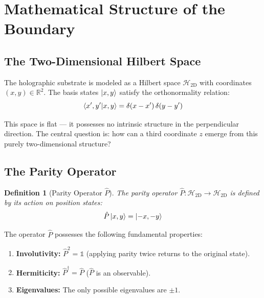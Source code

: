 \documentclass[12pt,a4paper,twoside]{article}
\newtheorem{definition}[theorem]{Definition}
\begin{document}

\section{Mathematical Structure of the Boundary}


\subsection{The Two-Dimensional Hilbert Space}

The holographic substrate is modeled as a Hilbert space $\mathcal{H}_{2\text{D}}$ with coordinates $(x, y) \in \mathbb{R}^2$. The basis states $\ket{x, y}$ satisfy the orthonormality relation:
\begin{equation}
\braket{x', y'}{x, y} = \delta(x - x')\,\delta(y - y')
\label{eq:ortonormalidade}
\end{equation}

This space is flat --- it possesses no intrinsic structure in the perpendicular direction. The central question is: how can a third coordinate $z$ emerge from this purely two-dimensional structure?

\subsection{The Parity Operator}

\begin{definition}[Parity Operator $\hat{P}$]
The parity operator $\hat{P}: \mathcal{H}_{2\text{D}} \to \mathcal{H}_{2\text{D}}$ is defined by its action on position states:
\begin{equation}
\hat{P}\ket{x, y} = \ket{-x, -y}
\label{eq:paridade_def}
\end{equation}
\end{definition}

\noindent The operator $\hat{P}$ possesses the following fundamental properties:

\begin{enumerate}[nosep,label=(\roman*)]
\item \textbf{Involutivity:} $\hat{P}^2 = \mathbb{1}$ (applying parity twice returns to the original state).
\item \textbf{Hermiticity:} $\hat{P}^\dagger = \hat{P}$ ($\hat{P}$ is an observable).
\item \textbf{Eigenvalues:} The only possible eigenvalues are $\pm 1$.
\end{enumerate}
\end{document}
